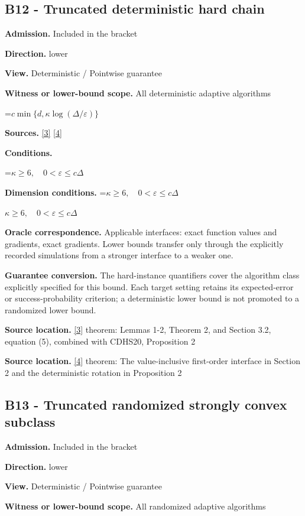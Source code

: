 \documentclass[10pt,a4paper]{article}
\newcommand{\AtlasMath}[1]{\par\begingroup\centering\setbox0=\hbox{$\displaystyle #1$}\ifdim\wd0>1.4\linewidth\typeout{ATLAS WIDE FORMULA: \the\wd0}\fi\ifdim\wd0>\linewidth\resizebox{\linewidth}{!}{\box0}\else\box0\fi\par\endgroup}
\newcommand{\AtlasInlineMath}[1]{\begingroup\setbox0=\hbox{$#1$}\ifdim\wd0>.4\linewidth\endgroup\AtlasMath{#1}\else\endgroup$#1$\fi}
\begin{document}
\subsection{B12 - Truncated deterministic hard chain}
\textbf{Admission.} Included in the bracket

\textbf{Direction.} lower

\textbf{View.} Deterministic / Pointwise guarantee

\textbf{Witness or lower-bound scope.} All deterministic adaptive algorithms

\AtlasMath{c\min\{d,\kappa\log(\Delta/\varepsilon)\}}
\textbf{Sources.} \href{https://arxiv.org/pdf/2212.13551}{[3]} \href{https://arxiv.org/pdf/1710.11606}{[4]}

\textbf{Conditions.} 
\AtlasMath{\kappa\ge6,\quad0<\varepsilon\le c\Delta}


\textbf{Dimension conditions.} \AtlasInlineMath{\kappa\ge6,\quad0<\varepsilon\le c\Delta}

\textbf{Oracle correspondence.} Applicable interfaces: exact function values and gradients, exact gradients. Lower bounds transfer only through the explicitly recorded simulations from a stronger interface to a weaker one.

\textbf{Guarantee conversion.} The hard-instance quantifiers cover the algorithm class explicitly specified for this bound. Each target setting retains its expected-error or success-probability criterion; a deterministic lower bound is not promoted to a randomized lower bound.

\textbf{Source location.} \href{https://arxiv.org/pdf/2212.13551}{[3]} theorem: Lemmas 1-2, Theorem 2, and Section 3.2, equation (5), combined with CDHS20, Proposition 2

\textbf{Source location.} \href{https://arxiv.org/pdf/1710.11606}{[4]} theorem: The value-inclusive first-order interface in Section 2 and the deterministic rotation in Proposition 2

\subsection{B13 - Truncated randomized strongly convex subclass}
\textbf{Admission.} Included in the bracket

\textbf{Direction.} lower

\textbf{View.} Deterministic / Pointwise guarantee

\textbf{Witness or lower-bound scope.} All randomized adaptive algorithms
\end{document}
